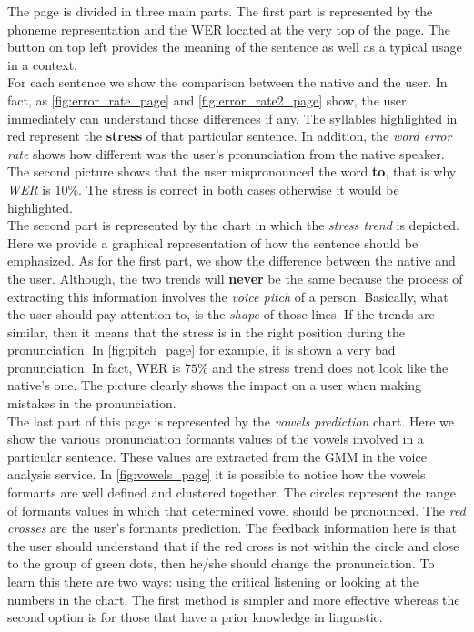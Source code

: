 \noindent The page is divided in three main parts. The first part is represented by the phoneme representation and the WER located at the very top of the page. The button on top left provides the meaning of the sentence as well as a typical usage in a context.\\
\noindent For each sentence we show the comparison between the native and the user. In fact, as \ref{fig:error_rate_page} and \ref{fig:error_rate2_page} show, the user immediately can understand those differences if any. The syllables highlighted in red represent the \textbf{stress} of that particular sentence. In addition, the \textit{word error rate} shows how different was the user's pronunciation from the native speaker. The second picture shows that the user mispronounced the word \textbf{to}, that is why \textit{WER} is $10\%$. The stress is correct in both cases otherwise it would be highlighted. \\

\noindent The second part is represented by the chart in which the \textit{stress trend} is depicted. Here we provide a graphical representation of how the sentence should be emphasized. As for the first part, we show the difference between the native and the user. Although, the two trends will \textbf{never} be the same because the process of extracting this information involves the \textit{voice pitch} of a person. Basically, what the user should pay attention to, is the \textit{shape} of those lines. If the trends are similar, then it means that the stress is in the right position during the pronunciation. In \ref{fig:pitch_page} for example, it is shown a very bad pronunciation. In fact, WER is $75\%$ and the stress trend does not look like the native's one. The picture clearly shows the impact on a user when making mistakes in the pronunciation. \\

\noindent The last part of this page is represented by the \textit{vowels prediction} chart. Here we show the various pronunciation formants values of the vowels involved in a particular sentence. These values are extracted from the GMM in the voice analysis service. In \ref{fig:vowels_page} it is possible to notice how the vowels formants are well defined and clustered together. The circles represent the range of formants values in which that determined vowel should be pronounced. The \textit{red crosses} are the user's formants prediction. The feedback information here is that the user should understand that if the red cross is not within the circle and close to the group of green dots, then he/she should change the pronunciation. To learn this there are two ways: using the critical listening or looking at the numbers in the chart. The first method is simpler and more effective whereas the second option is for those that have a prior knowledge in linguistic. \\

